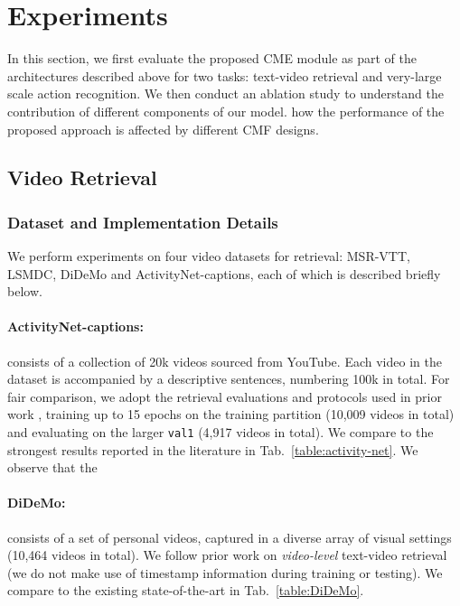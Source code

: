 \section{Experiments}\label{sec:experiments}


In this section, we first evaluate the proposed CME module as part of the architectures described above for two tasks: text-video retrieval and very-large scale action recognition. We then conduct an ablation study to understand the contribution of different components of our model. how the performance of the proposed approach is affected by different CMF designs. 


\subsection{Video Retrieval}

\subsubsection{Dataset and Implementation Details}

We perform experiments on four video datasets for retrieval:  MSR-VTT, LSMDC, DiDeMo and ActivityNet-captions, each of which is described briefly below.


\paragraph{ActivityNet-captions:} \cite{krishna2017dense} consists of a collection of 20k videos sourced from YouTube.  Each video in the dataset is accompanied by a descriptive sentences, numbering 100k in total.  For fair comparison, we adopt the retrieval evaluations and protocols used in prior work \cite{zhang2018cross,liu2019use}, training up to 15 epochs on the training partition (10,009 videos in total) and evaluating on the larger \texttt{val1} (4,917 videos in total).  We compare to the strongest results reported in the literature in Tab.~\ref{table:activity-net}. We observe that the 




\paragraph{DiDeMo:} \cite{anne2017localizing} consists of a set of personal videos, captured in a diverse array of visual settings (10,464 videos in total).  We follow prior work on \textit{video-level} text-video retrieval (we do not make use of timestamp information during training or testing).  We compare to the existing state-of-the-art in Tab.~\ref{table:DiDeMo}.

